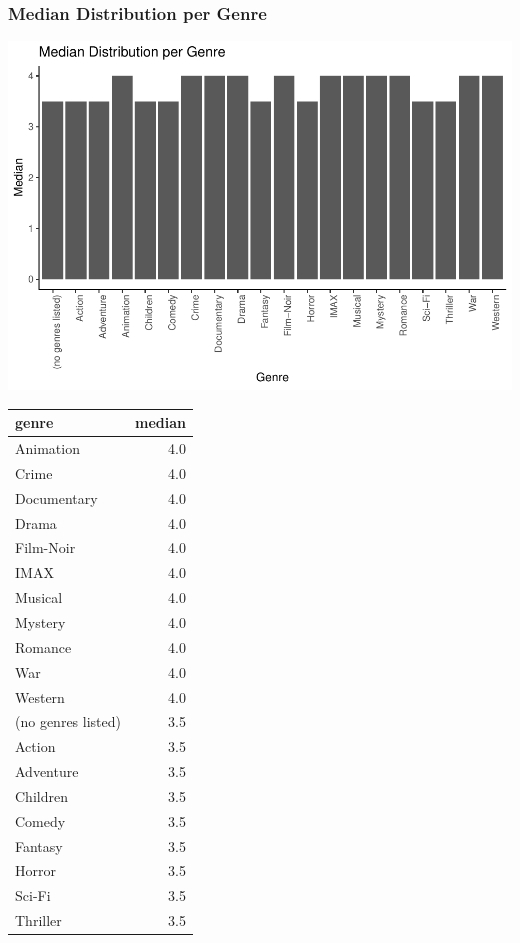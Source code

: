 \documentclass[]{article}
\begin{document}
\hypertarget{median-distribution-per-genre}{%
\subsubsection{Median Distribution per
Genre}\label{median-distribution-per-genre}}

\begin{center}\includegraphics{MovieLens_Project_Report_files/figure-latex/unnamed-chunk-30-1} \end{center}

\begin{table}[H]
\centering\begingroup\fontsize{10}{12}\selectfont

\begin{tabular}{l|r}
\hline
genre & median\\
\hline
Animation & 4.0\\
\hline
Crime & 4.0\\
\hline
Documentary & 4.0\\
\hline
Drama & 4.0\\
\hline
Film-Noir & 4.0\\
\hline
IMAX & 4.0\\
\hline
Musical & 4.0\\
\hline
Mystery & 4.0\\
\hline
Romance & 4.0\\
\hline
War & 4.0\\
\hline
Western & 4.0\\
\hline
(no genres listed) & 3.5\\
\hline
Action & 3.5\\
\hline
Adventure & 3.5\\
\hline
Children & 3.5\\
\hline
Comedy & 3.5\\
\hline
Fantasy & 3.5\\
\hline
Horror & 3.5\\
\hline
Sci-Fi & 3.5\\
\hline
Thriller & 3.5\\
\hline
\end{tabular}
\endgroup{}
\end{table}
\end{document}
